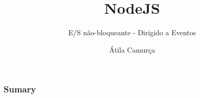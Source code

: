 \documentclass[10pt]{beamer}
\title{NodeJS}
\subtitle{E/S não-bloqueante - Dirigido a Eventos}
\author{Átila Camurça}
\begin{document}
\begin{frame}
\titlepage
\end{frame}

\begin{frame}\frametitle{Sumary}
\tableofcontents
\end{frame}


\end{document}
